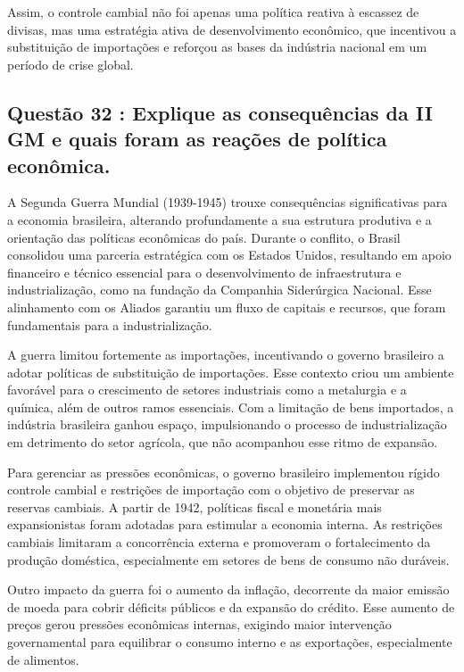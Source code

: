 \documentclass[a4paper,12pt]{article}[abntex2]
\begin{document}
Assim, o controle cambial não foi apenas uma política reativa à escassez de divisas, mas uma estratégia ativa de desenvolvimento econômico, que incentivou a substituição de importações e reforçou as bases da indústria nacional em um período de crise global.

\subsection{\textbf{Questão 32 : Explique as consequências da II GM e quais foram as reações de política econômica.}}

A Segunda Guerra Mundial (1939-1945) trouxe consequências significativas para a economia brasileira, alterando profundamente a sua estrutura produtiva e a orientação das políticas econômicas do país. Durante o conflito, o Brasil consolidou uma parceria estratégica com os Estados Unidos, resultando em apoio financeiro e técnico essencial para o desenvolvimento de infraestrutura e industrialização, como na fundação da Companhia Siderúrgica Nacional. Esse alinhamento com os Aliados garantiu um fluxo de capitais e recursos, que foram fundamentais para a industrialização.

A guerra limitou fortemente as importações, incentivando o governo brasileiro a adotar políticas de substituição de importações. Esse contexto criou um ambiente favorável para o crescimento de setores industriais como a metalurgia e a química, além de outros ramos essenciais. Com a limitação de bens importados, a indústria brasileira ganhou espaço, impulsionando o processo de industrialização em detrimento do setor agrícola, que não acompanhou esse ritmo de expansão.

Para gerenciar as pressões econômicas, o governo brasileiro implementou rígido controle cambial e restrições de importação com o objetivo de preservar as reservas cambiais. A partir de 1942, políticas fiscal e monetária mais expansionistas foram adotadas para estimular a economia interna. As restrições cambiais limitaram a concorrência externa e promoveram o fortalecimento da produção doméstica, especialmente em setores de bens de consumo não duráveis.

Outro impacto da guerra foi o aumento da inflação, decorrente da maior emissão de moeda para cobrir déficits públicos e da expansão do crédito. Esse aumento de preços gerou pressões econômicas internas, exigindo maior intervenção governamental para equilibrar o consumo interno e as exportações, especialmente de alimentos.
\end{document}
